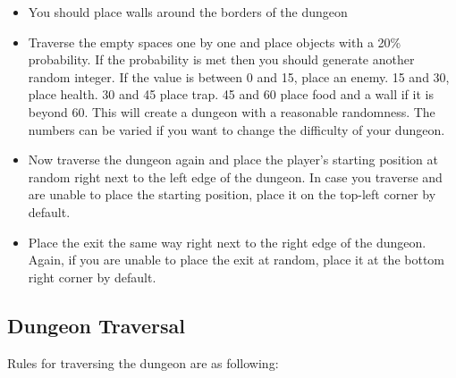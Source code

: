 \documentclass[a4paper,12pt]{article}
\begin{document}
	\begin{itemize}
		\item You should place walls around the borders of the dungeon
		\item Traverse the empty spaces one by one and place objects with a 20\% probability. If the probability is met then you should generate another random integer. If the value is between 0 and 15, place an enemy. 15 and 30, place health. 30 and 45 place trap. 45 and 60 place food and a wall if it is beyond 60. This will create a dungeon with a reasonable randomness. The numbers can be varied if you want to change the difficulty of your dungeon.
		\item Now traverse the dungeon again and place the player's starting position at random right next to the left edge of the dungeon. In case you traverse and are unable to place the starting position, place it on the top-left corner by default.
		\item Place the exit the same way right next to the right edge of the dungeon. Again, if you are unable to place the exit at random, place it at the bottom right corner by default.
	\end{itemize}

	\subsection{Dungeon Traversal}
	Rules for traversing the dungeon are as following:
	
\end{document}
